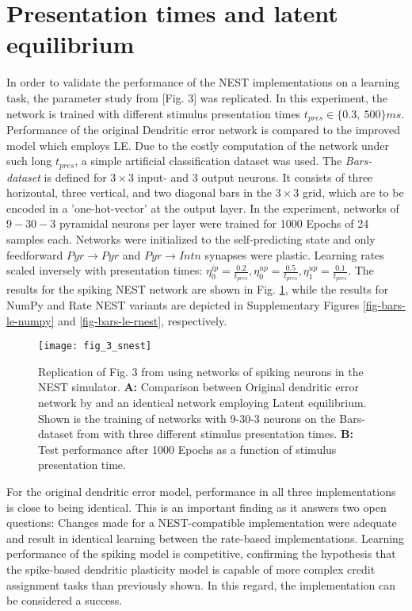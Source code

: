 \section{Presentation times and latent equilibrium}\label{sec-le-tpres}

In order to validate the performance of the NEST implementations on a learning task, the parameter study from
\citep{Haider2021}[Fig. 3] was replicated. In this experiment, the network is trained with different stimulus
presentation times $t_{pres} \in \{0.3,\ 500\}ms$. Performance of the original Dendritic error network is compared to
the improved model which employs LE. Due to the costly computation of the network under such long $t_{pres}$, a simple
artificial classification dataset was used. The \textit{Bars-dataset} is defined for $3\times3$ input- and $3$ output
neurons. It consists of three horizontal, three vertical, and two diagonal bars in the $3\times3$ grid, which are to be
encoded in a 'one-hot-vector' at the output layer. In the experiment, networks of $9-30-3$ pyramidal neurons per layer
were trained for 1000 Epochs of 24 samples each. Networks were initialized to the self-predicting state and only
feedforward $Pyr\rightarrow Pyr$ and $Pyr \rightarrow Intn$ synapses were plastic. Learning rates scaled inversely with
presentation times: $\eta^{ip}_0 = \frac{0.2}{t_{pres}}, \eta^{up}_0 = \frac{0.5}{t_{pres}}, \eta^{up}_1 =
\frac{0.1}{t_{pres}}$. The results for the spiking NEST network are shown in Fig. \ref{fig-bars-le-snest}, while the
results for NumPy and Rate NEST variants are depicted in Supplementary Figures \ref{fig-bars-le-numpy} and
\ref{fig-bars-le-rnest}, respectively.


\begin{figure}[h]
    \centering
    \texttt{[image: fig\_3\_snest]}
    \caption[Replication of Fig. 3 from \citep{Haider2021}.]{Replication of Fig. 3 from \citep{Haider2021} using
        networks of spiking neurons in the NEST simulator. \textbf{A:} Comparison between Original dendritic error
        network by and an identical network employing Latent equilibrium. Shown is the training of networks with 9-30-3
        neurons on the Bars-dataset from with three different stimulus presentation times. \textbf{B:} Test performance
        after 1000 Epochs as a function of stimulus presentation time.}
    \label{fig-bars-le-snest}
\end{figure}

For the original dendritic error model, performance in all three implementations is close to being identical. This is an
important finding as it answers two open questions: Changes made for a NEST-compatible implementation were adequate and
result in identical learning between the rate-based implementations. Learning performance of the spiking model is
competitive, confirming the hypothesis that the spike-based dendritic plasticity model is capable of more complex credit
assignment tasks than previously shown. In this regard, the implementation can be considered a success.

